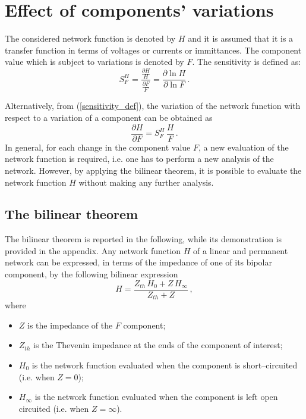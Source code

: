 \documentclass[journal]{IEEEtran}
\begin{document}
\section{Effect of components' variations}
The considered network function is denoted by $H$ and it is assumed that it is a transfer function in terms of voltages or currents or immittances. The component value which is subject to variations is denoted by $F$. 
The sensitivity is defined as:
%
\begin{equation}
S_{F}^H = \frac
{\frac{\partial H}{H}}
{\frac{\partial F}{F}}
= \frac{\partial \ln{H}}{\partial \ln{F}} \, .
\label{sensitivity_def}
\end{equation}

%
Alternatively, from (\ref{sensitivity_def}), the variation of the network function with respect to a variation of a component  can be obtained as
%
\begin{equation}
\frac{\partial {H}}{\partial {F}} 
= 
S_{F}^H \,
\frac{H}{F} \, .
\label{VIII.1.2}
\end{equation}
%
In general, for each change in the component value $F$, a new evaluation of the network function is required, i.e. one has to perform a new analysis of the network.
However, by applying the bilinear theorem, it is possible to evaluate the network function $H$ without making any further analysis.

\subsection{The bilinear theorem}
The bilinear theorem is reported in the following, while its demonstration is provided in the appendix.
Any network function $H$ of a linear and permanent network can be expressed, in terms of the impedance of one of its bipolar component, by the following bilinear expression
%
\begin{equation}
H = \frac{Z_{th} \, H_0 + Z \, H_{\infty}}{Z_{th}+Z} \, ,
\label{VIII.1.3}
\end{equation}
%
where
\begin{itemize}
\item $Z$ is the impedance of the $F$ component;
\item $Z_{th}$ is the Thevenin impedance at the ends of the component of interest;
\item $H_0$ is the network function evaluated when the component is short--circuited (i.e. when $Z=0$);
\item $H_\infty$ is the network function evaluated when the component is left open circuited (i.e. when $Z=\infty$).
\end{itemize}
\end{document}
